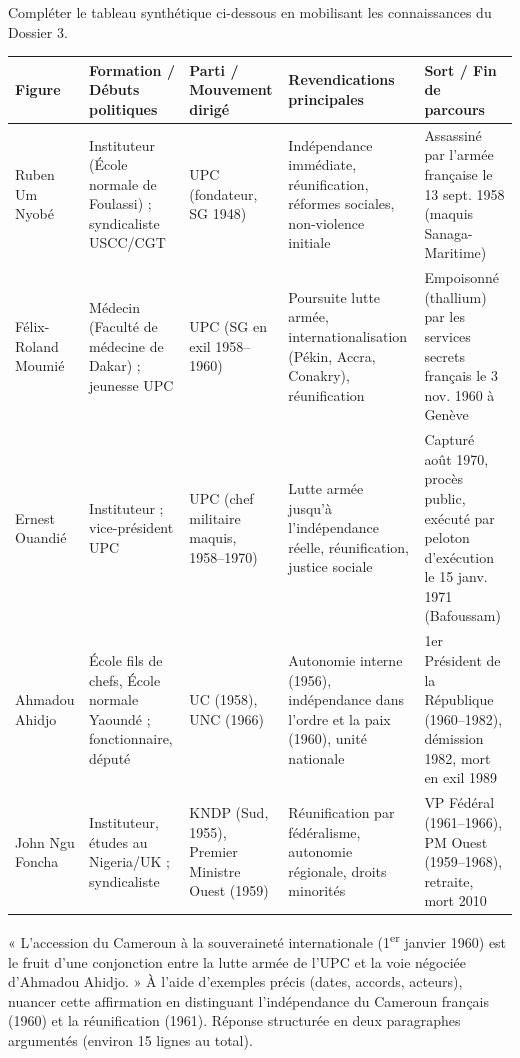 \documentclass[11pt]{article}
\begin{document}
\begin{exercice}
Compléter le tableau synthétique ci-dessous en mobilisant les connaissances du Dossier 3.

\begin{center}
\begin{tabularx}{\linewidth}{|l|X|X|X|X|}
\hline
\rowcolor{popblueL}
\textbf{Figure} & \textbf{Formation / Débuts politiques} & \textbf{Parti / Mouvement dirigé} & \textbf{Revendications principales} & \textbf{Sort / Fin de parcours} \\ \hline
Ruben Um Nyobé & Instituteur (École normale de Foulassi) ; syndicaliste USCC/CGT & UPC (fondateur, SG 1948) & Indépendance immédiate, réunification, réformes sociales, non-violence initiale & Assassiné par l'armée française le 13 sept. 1958 (maquis Sanaga-Maritime) \\ \hline
Félix-Roland Moumié & Médecin (Faculté de médecine de Dakar) ; jeunesse UPC & UPC (SG en exil 1958--1960) & Poursuite lutte armée, internationalisation (Pékin, Accra, Conakry), réunification & Empoisonné (thallium) par les services secrets français le 3 nov. 1960 à Genève \\ \hline
Ernest Ouandié & Instituteur ; vice-président UPC & UPC (chef militaire maquis, 1958--1970) & Lutte armée jusqu'à l'indépendance réelle, réunification, justice sociale & Capturé août 1970, procès public, exécuté par peloton d'exécution le 15 janv. 1971 (Bafoussam) \\ \hline
Ahmadou Ahidjo & École fils de chefs, École normale Yaoundé ; fonctionnaire, député & UC (1958), UNC (1966) & Autonomie interne (1956), indépendance dans l'ordre et la paix (1960), unité nationale & 1er Président de la République (1960--1982), démission 1982, mort en exil 1989 \\ \hline
John Ngu Foncha & Instituteur, études au Nigeria/UK ; syndicaliste & KNDP (Sud, 1955), Premier Ministre Ouest (1959) & Réunification par fédéralisme, autonomie régionale, droits minorités & VP Fédéral (1961--1966), PM Ouest (1959--1968), retraite, mort 2010 \\ \hline
\end{tabularx}
\end{center}
\end{exercice}

\begin{exercice}
« L'accession du Cameroun à la souveraineté internationale (1\textsuperscript{er} janvier 1960) est le fruit d'une conjonction entre la lutte armée de l'UPC et la voie négociée d'Ahmadou Ahidjo. »
À l'aide d'exemples précis (dates, accords, acteurs), nuancer cette affirmation en distinguant l'indépendance du Cameroun français (1960) et la réunification (1961). Réponse structurée en deux paragraphes argumentés (environ 15 lignes au total).
\end{exercice}
\end{document}
